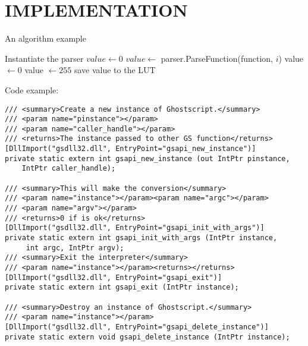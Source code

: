 \chapter{\MakeUppercase{Implementation}}
An algorithm example
\begin{algorithmic}
	\STATE Instantiate the parser
	\STATE \(value \leftarrow 0\)
	\STATE \(value \leftarrow\) parser.ParseFunction(function, \(i\))
	\STATE value \(\leftarrow 0\)
	\STATE value \(\leftarrow 255\)
	\ENDIF
	\STATE save value to the LUT
	\ENDFOR
\end{algorithmic}

Code example:
\lstset{language=c++}
\begin{lstlisting}
/// <summary>Create a new instance of Ghostscript.</summary>
/// <param name="pinstance"></param>
/// <param name="caller_handle"></param>
/// <returns>The instance passed to other GS function</returns>
[DllImport("gsdll32.dll", EntryPoint="gsapi_new_instance")]
private static extern int gsapi_new_instance (out IntPtr pinstance,
    IntPtr caller_handle);
 
/// <summary>This will make the conversion</summary>
/// <param name="instance"></param><param name="argc"></param>
/// <param name="argv"></param>
/// <returns>0 if is ok</returns>
[DllImport("gsdll32.dll", EntryPoint="gsapi_init_with_args")]
private static extern int gsapi_init_with_args (IntPtr instance,
	 int argc, IntPtr argv);
/// <summary>Exit the interpreter</summary>
/// <param name="instance"></param><returns></returns>
[DllImport("gsdll32.dll", EntryPoint="gsapi_exit")]
private static extern int gsapi_exit (IntPtr instance);
 
/// <summary>Destroy an instance of Ghostscript.</summary>
/// <param name="instance"></param>
[DllImport("gsdll32.dll", EntryPoint="gsapi_delete_instance")]
private static extern void gsapi_delete_instance (IntPtr instance);
\end{lstlisting}